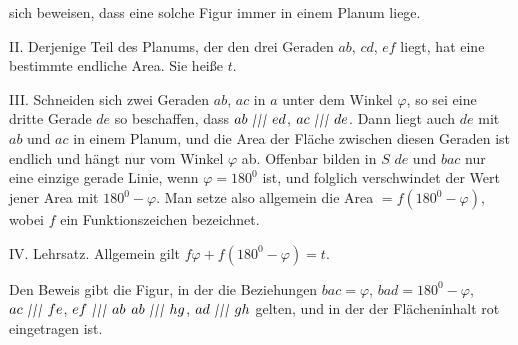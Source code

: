 %
sich beweisen, dass eine solche Figur immer in einem Planum liege.
\begin{center}\end{center}
II. Derjenige Teil des Planums, der  den drei Geraden $ab$, $cd$, $ef$ liegt, hat eine bestimmte endliche Area. Sie heiße $t$.

III. Schneiden sich zwei Geraden $ab$, $ac$ in $a$ unter dem Winkel $\varphi$, so sei eine dritte Gerade $de$ so beschaffen, dass $ab\TripleParallel ed$, $ac\TripleParallel de$. Dann liegt auch $de$ mit $ab$ und $ac$ in einem Planum, und die Area der Fläche zwischen diesen Geraden ist endlich und hängt nur vom Winkel $\varphi$ ab. Offenbar bilden in $S$ $de$ und $bac$ nur eine einzige gerade Linie, wenn $\varphi=180^{0}$ ist, und folglich verschwindet der Wert jener Area mit $180^{0}-\varphi$. Man setze also allgemein die Area $=f(180^{0}-\varphi)$, wobei $f$ ein Funktionszeichen bezeichnet.
\begin{center}\end{center}

IV. Lehrsatz. Allgemein gilt $f\varphi+f(180^{0}-\varphi)=t$.
\begin{center}\end{center}
Den Beweis gibt die Figur, in der die Beziehungen $bac=\varphi$, $bad=180^{0}-\varphi$, $ac\TripleParallel fe$, $ef\TripleParallel ab$ $ab\TripleParallel hg$, $ad\TripleParallel gh$ gelten, und in der der Flächeninhalt rot eingetragen ist.

